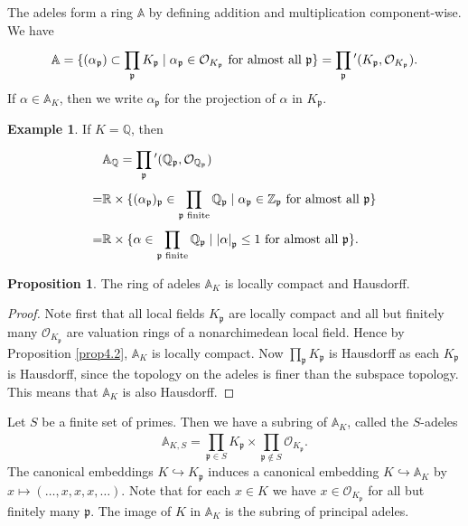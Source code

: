 \documentclass{article}
\theoremstyle{definition}
\newtheorem{prop}[theorem]{Proposition}
\newtheorem{example}{Example}[section]
\begin{document}
The adeles form a ring $\mathbb{A}$ by defining addition and multiplication component-wise. We have 
\begin{align*}
    \mathbb{A} = \{(\alpha_\mathfrak{p}) \subset \prod_{\mathfrak{p}}^{} K_{\mathfrak{p}} \mid \alpha_{\mathfrak{p}} \in \mathcal{O}_{K_{\mathfrak{p}}} \text{ for almost all }\mathfrak{p}\} = \prod_{\mathfrak{p}}^{} \hspace{0mm}' (K_{\mathfrak{p}},\mathcal{O}_{K_{\mathfrak{p}}}).
\end{align*}
If $\alpha \in \mathbb{A}_K$, then we write $\alpha_{\mathfrak{p}}$ for the projection of $\alpha$ in $K_{\mathfrak{p}}$.
\begin{example}
    If $K=\mathbb{Q}$, then
    \begin{align*}
        &\mathbb{A}_{\mathbb{Q}} = \prod_{\mathfrak{p}}^{} \hspace{0mm}' (\mathbb{Q}_{\mathfrak{p}}, \mathcal{O}_{\mathbb{Q}_{\mathfrak{p}}}) \\
        =& \mathbb{R} \times \{(\alpha_{\mathfrak{p}})_{\mathfrak{p}} \in \prod_{\mathfrak{p} \text{ finite}}^{} \mathbb{Q}_{\mathfrak{p}} \mid \alpha_{\mathfrak{p}} \in \mathbb{Z}_{\mathfrak{p}} \text{ for almost all }\mathfrak{p}\}\\
        =& \mathbb{R} \times \{\alpha \in \prod_{\mathfrak{p} \text{ finite}}^{} \mathbb{Q}_{\mathfrak{p}} \mid \left|\alpha\right|_{\mathfrak{p}}\le 1 \text{ for almost all }\mathfrak{p}\}.
    \end{align*}
\end{example}
\begin{prop}\label{prop4.4}
    The ring of adeles $\mathbb{A}_K$ is locally compact and Hausdorff.
\end{prop}
\begin{proof}
    Note first that all local fields $K_{\mathfrak{p}}$ are locally compact and all but finitely many $\mathcal{O}_{K_{\mathfrak{p}}}$ are valuation rings of a nonarchimedean local field. Hence by Proposition \ref{prop4.2}, $\mathbb{A}_K$ is locally compact. Now $\prod_{\mathfrak{p}}^{} K_{\mathfrak{p}}$ is Hausdorff as each $K_{\mathfrak{p}}$ is Hausdorff, since the topology on the adeles is finer than the subspace topology. This means that $\mathbb{A}_K$ is also Hausdorff.
\end{proof}
Let $S$ be a finite set of primes. Then we have a subring of $\mathbb{A}_K$, called the $S$-adeles
\[
\mathbb{A}_{K,S} = \prod_{\mathfrak{p} \in S}^{} K_{\mathfrak{p}} \times \prod_{\mathfrak{p} \not\in S}^{} \mathcal{O}_{K_{\mathfrak{p}}}. 
\]
The canonical embeddings $K \hookrightarrow K_{\mathfrak{p}}$ induces a canonical embedding $K \hookrightarrow \mathbb{A}_K$ by $x \mapsto (\ldots,x,x,x,\ldots)$. Note that for each $x \in K$ we have $x \in \mathcal{O}_{K_{\mathfrak{p}}}$ for all but finitely many $\mathfrak{p}$. The image of $K$ in $\mathbb{A}_K$ is the subring of principal adeles.
\end{document}
